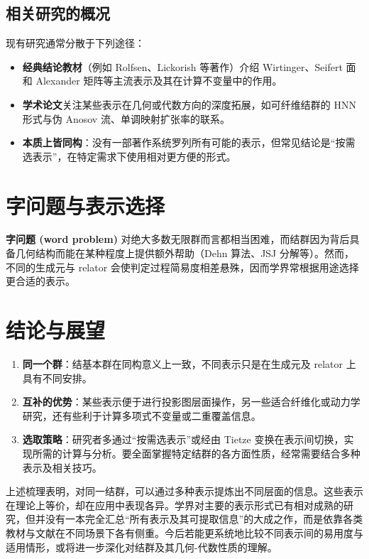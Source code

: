 \documentclass[12pt]{article}
\begin{document}
\subsection{相关研究的概况}
现有研究通常分散于下列途径：
\begin{itemize}
    \item \textbf{经典结论教材}（例如 Rolfsen、Lickorish 等著作）介绍 Wirtinger、Seifert 面和 Alexander 矩阵等主流表示及其在计算不变量中的作用。
    \item \textbf{学术论文}关注某些表示在几何或代数方向的深度拓展，如可纤维结群的 HNN 形式与伪 Anosov 流、单调映射扩张率的联系。
    \item \textbf{本质上皆同构}：没有一部著作系统罗列所有可能的表示，但常见结论是“按需选表示”，在特定需求下使用相对更方便的形式。
\end{itemize}

\section{字问题与表示选择}
\textbf{字问题 (word problem)} 对绝大多数无限群而言都相当困难，而结群因为背后具备几何结构而能在某种程度上提供额外帮助（Dehn 算法、JSJ 分解等）。然而，不同的生成元与 relator 会使判定过程简易度相差悬殊，因而学界常根据用途选择更合适的表示。

\section{结论与展望}
\begin{enumerate}
    \item \textbf{同一个群}：结基本群在同构意义上一致，不同表示只是在生成元及 relator 上具有不同安排。
    \item \textbf{互补的优势}：某些表示便于进行投影图层面操作，另一些适合纤维化或动力学研究，还有些利于计算多项式不变量或二重覆盖信息。
    \item \textbf{选取策略}：研究者多通过“按需选表示”或经由 Tietze 变换在表示间切换，实现所需的计算与分析。要全面掌握特定结群的各方面性质，经常需要结合多种表示及相关技巧。
\end{enumerate}

上述梳理表明，对同一结群，可以通过多种表示提炼出不同层面的信息。这些表示在理论上等价，却在应用中表现各异。学界对主要的表示形式已有相对成熟的研究，但并没有一本完全汇总“所有表示及其可提取信息”的大成之作，而是依靠各类教材与文献在不同场景下各有侧重。今后若能更系统地比较不同表示间的易用度与适用情形，或将进一步深化对结群及其几何-代数性质的理解。
\end{document}
